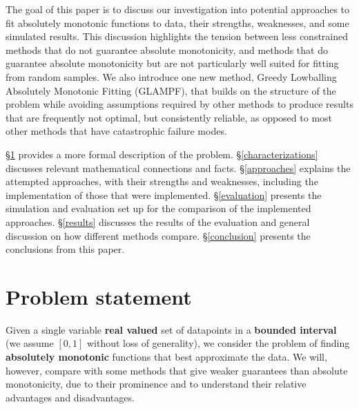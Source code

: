 \documentclass[12pt,a4paper]{article}
\begin{document}
The goal of this paper is to discuss our investigation into potential approaches to fit absolutely monotonic functions to data, their strengths, weaknesses, and some simulated results. This discussion highlights the tension between less constrained methods that do not guarantee absolute monotonicity, and methods that do guarantee absolute monotonicity but are not particularly well suited for fitting from random samples. We also introduce one new method, Greedy Lowballing Absolutely Monotonic Fitting (GLAMPF), that builds on the structure of the problem while avoiding assumptions required by other methods to produce results that are frequently not optimal, but consistently reliable, as opposed to most other methods that have catastrophic failure modes.

\S \ref{problem_statement} provides a more formal description of the problem. \S \ref{characterizations} discusses relevant mathematical connections and facts. \S \ref{approaches} explains the attempted approaches, with their strengths and weaknesses, including the implementation of those that were implemented. \S \ref{evaluation} presents the simulation and evaluation set up for the comparison of the implemented approaches. \S \ref{results} discusses the results of the evaluation and general discussion on how different methods compare. \S \ref{conclusion} presents the conclusions from this paper.

\section{Problem statement}
\label{problem_statement}

Given a single variable {\bf{real valued}} set of datapoints in a {\bf{bounded interval}} (we assume $[0,1]$ without loss of generality), we consider the problem of finding {\bf{absolutely monotonic}} functions that best approximate the data. We will, however, compare with some methods that give weaker guarantees than absolute monotonicity, due to their prominence and to understand their relative advantages and disadvantages.
\end{document}

